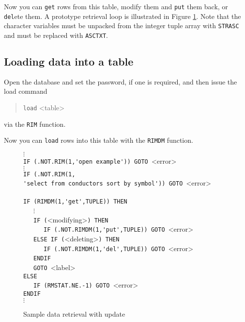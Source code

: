 \documentclass[11pt,a4paper]{report}
\def\I{\index}
\begin{document}
Now you can \verb!get! rows from this table, modify them
and \verb!put! them back, or \verb!del!ete them.
A prototype retrieval loop is illustrated in Figure \ref{pi-ret}.
Note that the character variables must be unpacked from the integer
tuple array with \verb!STRASC! and must be replaced with \verb!ASCTXT!.
 

\subsection{Loading data into a table}
%
\I{load@"load"}
Open the database and set the password, if one is required, and then
issue the load command
\begin{verse}
  \verb!load! <table>
\end{verse}
via the \verb!RIM! function.
 
Now you can \verb!load! rows into this table with the
\verb!RIMDM! function.
 
\begin{figure}
$\vdots$\\
    \verb!IF (.NOT.RIM(1,'open example')) GOTO !<error>\\
    $\vdots$\\
    \verb!IF (.NOT.RIM(1,! \\
       \verb!'select from conductors sort by symbol')) GOTO !<error>\\
    \\
    \verb!IF (RIMDM(1,'get',TUPLE)) THEN!  \\
    ~~~$\vdots$\\
    ~~~\verb!IF (!<modifying>\verb!) THEN!\\
    ~~~~~~\verb!IF (.NOT.RIMDM(1,'put',TUPLE)) GOTO !<error>\\
    ~~~\verb!ELSE IF (!<deleting>\verb!) THEN !\\
    ~~~~~~\verb!IF (.NOT.RIMDM(1,'del',TUPLE)) GOTO !<error>\\
    ~~~\verb!ENDIF!\\
    ~~~\verb!GOTO !<label>\\
    \verb!ELSE! \\
    ~~~\verb!IF (RMSTAT.NE.-1) GOTO !<error>\\
    \verb!ENDIF! \\
    $\vdots$
\caption{Sample data retrieval with update}
\label{pi-ret}
\end{figure}
\I{Fortran|)}
 
 
 
\end{document}
